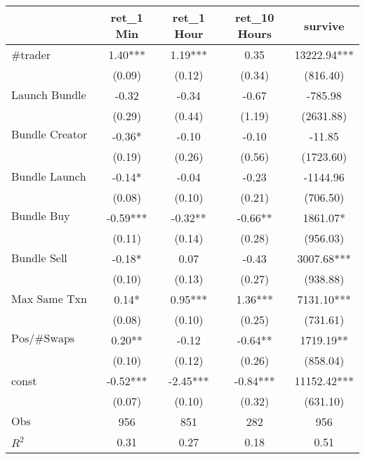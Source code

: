 \begin{tabular}{lcccc}
\hline
 & ret_1 Min & ret_1 Hour & ret_10 Hours & survive \\
\hline
#trader & 1.40*** & 1.19*** & 0.35 & 13222.94*** \\
 & (0.09) & (0.12) & (0.34) & (816.40) \\
$\text{Launch Bundle}$ & -0.32 & -0.34 & -0.67 & -785.98 \\
 & (0.29) & (0.44) & (1.19) & (2631.88) \\
$\text{Bundle Creator Buy}$ & -0.36* & -0.10 & -0.10 & -11.85 \\
 & (0.19) & (0.26) & (0.56) & (1723.60) \\
$\text{Bundle Launch}$ & -0.14* & -0.04 & -0.23 & -1144.96 \\
 & (0.08) & (0.10) & (0.21) & (706.50) \\
$\text{Bundle Buy}$ & -0.59*** & -0.32** & -0.66** & 1861.07* \\
 & (0.11) & (0.14) & (0.28) & (956.03) \\
$\text{Bundle Sell}$ & -0.18* & 0.07 & -0.43 & 3007.68*** \\
 & (0.10) & (0.13) & (0.27) & (938.88) \\
$\text{Max Same Txn}$ & 0.14* & 0.95*** & 1.36*** & 7131.10*** \\
 & (0.08) & (0.10) & (0.25) & (731.61) \\
$\text{Pos/\#Swaps}$ & 0.20** & -0.12 & -0.64** & 1719.19** \\
 & (0.10) & (0.12) & (0.26) & (858.04) \\
const & -0.52*** & -2.45*** & -0.84*** & 11152.42*** \\
 & (0.07) & (0.10) & (0.32) & (631.10) \\
$\text{Obs}$ & 956 & 851 & 282 & 956 \\
$R^2$ & 0.31 & 0.27 & 0.18 & 0.51 \\
\hline
\end{tabular}